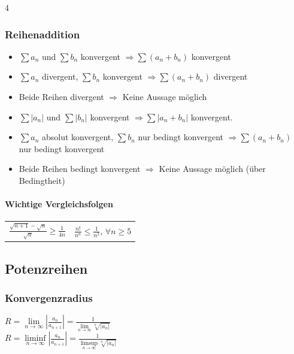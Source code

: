 \documentclass[6pt,a4paper]{scrartcl}
\newcommand{\abs}[1]{\ensuremath{\left\vert#1\right\vert}}
\begin{document}
\begin{multicols*}{4}
\begin{sectionbox}
		\subsubsection{Reihenaddition}
		\begin{itemize}
			\item $\sum a_n$ und $\sum b_n$ konvergent $\Rightarrow \sum (a_n+b_n)$ konvergent
			\item $\sum a_n$ divergent, $\sum b_n$ konvergent $\Rightarrow \sum (a_n+b_n)$ divergent
			\item Beide Reihen divergent $\Rightarrow$ Keine Aussage möglich
			\item $\sum |a_n|$ und $\sum |b_n|$ konvergent $\Rightarrow \sum |a_n+b_n|$ konvergent.
			\item $\sum a_n$ absolut konvergent, $\sum b_n$ nur bedingt konvergent $\Rightarrow \sum (a_n+b_n)$ nur bedingt konvergent
			\item Beide Reihen bedingt konvergent $\Rightarrow$ Keine Aussage möglich (über Bedingtheit)
		\end{itemize}
	\end{sectionbox}

	\begin{sectionbox}
		\vspace{-3mm}
		\paragraph{Wichtige Vergleichsfolgen\\}
		\begin{tabular}{l|l}
			$\frac{\sqrt{n+1}-\sqrt{n}}{\sqrt{n}} \ge \frac{1}{4n}$ & $\frac{n!}{n^n}\le \frac{1}{n^2}$, $\forall n \ge 5$
		\end{tabular}
	\end{sectionbox}

	\subsection{Potenzreihen}
	\begin{sectionbox}
		\subsubsection{Konvergenzradius}
		$R = \lim\limits_{n\rightarrow \infty} \abs{\frac{a_n}{a_{n+1}}}=\frac{1}{\lim\limits_{n\rightarrow \infty}\sqrt[n]{\abs{a_n}}}$ \\
		$R =\liminf\limits_{n\rightarrow \infty} \abs{\frac{a_n}{a_{n+1}}}=\frac{1}{\limsup\limits_{n\rightarrow \infty}\sqrt[n]{\abs{a_n}}}$
	\end{sectionbox}


\end{multicols*}
\end{document}
